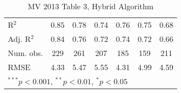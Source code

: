 \documentclass[12pt]{article}
\begin{document}
\begin{table}
\begin{center}
\begin{tabular}{l c c c c c c }
			R$^2$                  & 0.85         & 0.78          & 0.74           & 0.76         & 0.75           & 0.68          \\
			Adj. R$^2$             & 0.84         & 0.76          & 0.72           & 0.74         & 0.72           & 0.66          \\
			Num. obs.              & 229          & 261           & 207            & 185          & 159            & 211           \\
			RMSE                   & 4.33         & 5.47          & 5.55           & 4.31         & 4.99           & 4.59          \\
			\hline
			\multicolumn{7}{l}{\scriptsize{$^{***}p<0.001$, $^{**}p<0.01$, $^*p<0.05$}}
		\end{tabular}
		\caption{MV 2013 Table 3, Hybrid Algorithm}
	\end{center}
\end{table}
\end{document}
